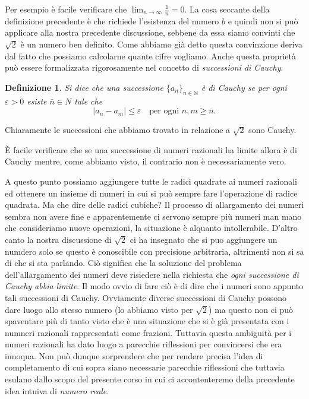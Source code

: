 \documentclass[10pt, twoside]{article}
\numberwithin{equation}{section}
\newtheorem{defin}{Definizione}
\newcommand\N{\mathbb N}
\begin{document}
Per esempio \`e facile verificare che $\lim_{n\to\infty}\frac
1n=0$. La cosa seccante della definizione precedente \`e che richiede
l'esistenza del numero $b$ e quindi non si pu\`o applicare alla nostra
precedente discussione, sebbene da essa siamo convinti che $\sqrt 2$
\`e un numero ben definito. Come abbiamo gi\`a detto questa
convinzione deriva dal fatto che possiamo calcolarne quante cifre
vogliamo. Anche questa propriet\`a pu\`o essere formalizzata
rigorosamente nel concetto di \emph{successioni di Cauchy}.
\begin{defin}
Si dice che una successione $\{a_n\}_{n\in\N}$ \`e di Cauchy se
per ogni $\varepsilon>0$ esiste $\bar n\in N$ tale che
\[
|a_n-a_m|\leq \varepsilon\quad \text{per ogni }n,m\geq \bar n.
\]
\end{defin}
Chiaramente le successioni che abbiamo trovato in relazione a $\sqrt
2$ sono Cauchy.

\`E facile verificare che se una successione di numeri razionali ha
limite allora \`e di Cauchy mentre, come abbiamo visto, il contrario
non \`e necessariamente vero. 

A questo punto possiamo aggiungere tutte le radici quadrate ai numeri razionali
ed ottenere un insieme di numeri in cui si pu\`o sempre fare
l'operazione di radice quadrata. Ma che dire delle radici cubiche? Il
processo di allargamento dei numeri sembra non avere fine e
apparentemente ci servono sempre pi\`u numeri man mano che
consideriamo nuove operazioni, la situazione \`e alquanto
intollerabile. D'altro canto la nostra discussione di $\sqrt 2$ ci ha
insegnato che si puo aggiungere un numdero solo se questo \`e
conoscibile con precisione arbitraria, altrimenti non si sa di che si
sta parlando.  Ci\`o significa che la soluzione del problema
dell'allargamento dei numeri deve risiedere nella richiesta che
\emph{ogni successione di Cauchy abbia limite}. Il modo ovvio di fare
ci\`o \`e di dire che i numeri sono appunto tali successioni di
Cauchy. Ovviamente diverse successioni di Cauchy possono dare luogo
allo stesso numero (lo abbiamo visto per $\sqrt 2$) ma questo non ci
pu\`o spaventare pi\`u di tanto visto che \`e una situazione che si
\`e gi\`a presentata con i numneri razionali rappresentati come
frazioni. Tuttavia questa ambiguit\`a per i numeri razionali ha dato
luogo a parecchie riflessioni per convincersi che era
innoqua. Non pu\`o dunque sorprendere che per rendere precisa l'idea di
completamento di cui sopra siano necessarie parecchie riflessioni che
tuttavia esulano dallo scopo del presente corso in cui ci
accontenteremo della precedente idea intuiva di \emph{numero reale}.
\end{document}
